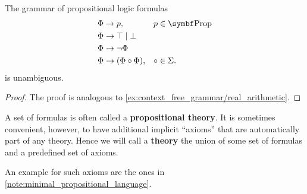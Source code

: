 \begin{proposition}\label{thm:propositional_formulas_are_unambiguous}
  The grammar of propositional logic formulas
  \begin{displaymath}
    \begin{aligned}
      &\Phi \to p,                 &&p \in \Bold{Prop} \\
      &\Phi \to \top \;|\; \bot    && \\
      &\Phi \to \neg \Phi          && \\
      &\Phi \to (\Phi \circ \Phi), &&\circ \in \Sigma.
    \end{aligned}
  \end{displaymath}
  is unambiguous.
\end{proposition}
\begin{proof}
  The proof is analogous to \cref{ex:context_free_grammar/real_arithmetic}.
\end{proof}

\begin{definition}\label{def:propositional_theory}
  A set of formulas is often called a \textbf{propositional theory}. It is sometimes convenient, however, to have additional implicit \enquote{axioms} that are automatically part of any theory. Hence we will call a \textbf{theory} the union of some set of formulas and a predefined set of axioms.

  An example for such axioms are the ones in \cref{note:minimal_propositional_language}.
\end{definition}

